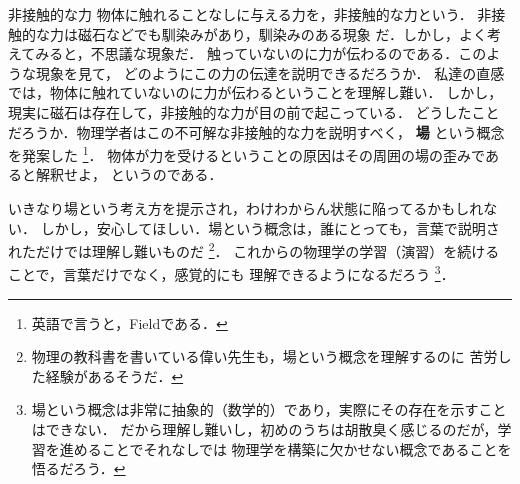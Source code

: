     \begin{memo}{非接触的な力}
        物体に触れることなしに与える力を，非接触的な力という．
        非接触的な力は磁石などでも馴染みがあり，馴染みのある現象
        だ．しかし，よく考えてみると，不思議な現象だ．
        触っていないのに力が伝わるのである．このような現象を見て，
        どのようにこの力の伝達を説明できるだろうか．
        私達の直感では，物体に触れていないのに力が伝わるということを理解し難い．
        しかし，現実に磁石は存在して，非接触的な力が目の前で起こっている．
        どうしたことだろうか．物理学者はこの不可解な非接触的な力を説明すべく，
        \textbf{場} という概念を発案した
            \footnote{
                英語で言うと，Fieldである．
            }．
        物体が力を受けるということの原因はその周囲の場の歪みであると解釈せよ，
        というのである．

        いきなり場という考え方を提示され，わけわからん状態に陥ってるかもしれない．
        しかし，安心してほしい．場という概念は，誰にとっても，言葉で説明されただけでは理解し難いものだ
            \footnote{
                物理の教科書を書いている偉い先生も，場という概念を理解するのに
                苦労した経験があるそうだ．
            }．
        これからの物理学の学習（演習）を続けることで，言葉だけでなく，感覚的にも
        理解できるようになるだろう
            \footnote{
                場という概念は非常に抽象的（数学的）であり，実際にその存在を示すことはできない．
                だから理解し難いし，初めのうちは胡散臭く感じるのだが，学習を進めることでそれなしでは
                物理学を構築に欠かせない概念であることを悟るだろう．
            }．
    \end{memo}




